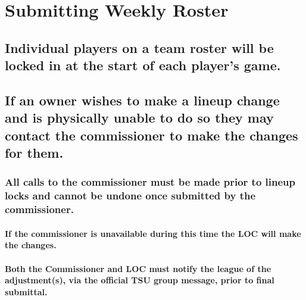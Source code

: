 \documentclass[]{book}
\let\oldparagraph\paragraph
\renewcommand{\paragraph}[1]{\oldparagraph{#1}\mbox{}}
\begin{document}
\hypertarget{submitting-weekly-roster}{%
\section{Submitting Weekly Roster}\label{submitting-weekly-roster}}

\hypertarget{individual-players-on-a-team-roster-will-be-locked-in-at-the-start-of-each-players-game.}{%
\subsection{Individual players on a team roster will be locked in at the start of each player's game.}\label{individual-players-on-a-team-roster-will-be-locked-in-at-the-start-of-each-players-game.}}

\hypertarget{if-an-owner-wishes-to-make-a-lineup-change-and-is-physically-unable-to-do-so-they-may-contact-the-commissioner-to-make-the-changes-for-them.}{%
\subsection{If an owner wishes to make a lineup change and is physically unable to do so they may contact the commissioner to make the changes for them.}\label{if-an-owner-wishes-to-make-a-lineup-change-and-is-physically-unable-to-do-so-they-may-contact-the-commissioner-to-make-the-changes-for-them.}}

\hypertarget{all-calls-to-the-commissioner-must-be-made-prior-to-lineup-locks-and-cannot-be-undone-once-submitted-by-the-commissioner.}{%
\subsubsection{All calls to the commissioner must be made prior to lineup locks and cannot be undone once submitted by the commissioner.}\label{all-calls-to-the-commissioner-must-be-made-prior-to-lineup-locks-and-cannot-be-undone-once-submitted-by-the-commissioner.}}

\hypertarget{if-the-commissioner-is-unavailable-during-this-time-the-loc-will-make-the-changes.}{%
\paragraph{If the commissioner is unavailable during this time the LOC will make the changes.}\label{if-the-commissioner-is-unavailable-during-this-time-the-loc-will-make-the-changes.}}

\hypertarget{both-the-commissioner-and-loc-must-notify-the-league-of-the-adjustments-via-the-official-tsu-group-message-prior-to-final-submittal.}{%
\paragraph{Both the Commissioner and LOC must notify the league of the adjustment(s), via the official TSU group message, prior to final submittal.}\label{both-the-commissioner-and-loc-must-notify-the-league-of-the-adjustments-via-the-official-tsu-group-message-prior-to-final-submittal.}}
\end{document}
